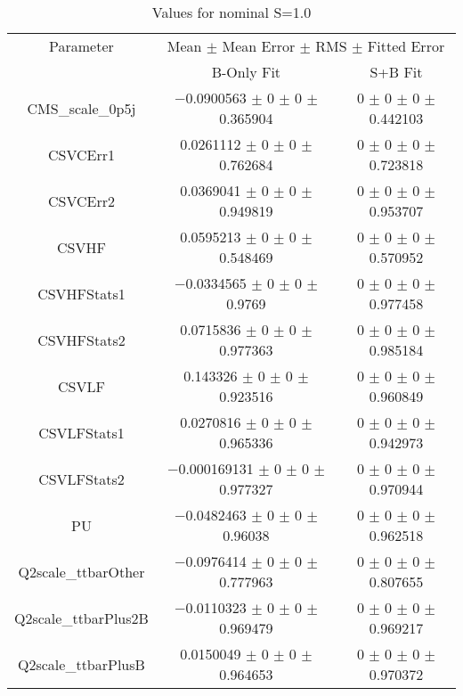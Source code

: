 \begin{table}
\centering
\caption{Values for nominal S=1.0}
\begin{tabular}{ccc}
\toprule
Parameter & \multicolumn{2}{c}{Mean $\pm$ Mean Error $\pm$ RMS $\pm$ Fitted Error}\\
 & B-Only Fit & S+B Fit\\
\midrule
CMS\_scale\_0p5j & \num{-0.0900563} $\pm$ \num{0} $\pm$ \num{0} $\pm$ \num{0.365904} & \num{0} $\pm$ \num{0} $\pm$ \num{0} $\pm$ \num{0.442103}\\
CSVCErr1 & \num{0.0261112} $\pm$ \num{0} $\pm$ \num{0} $\pm$ \num{0.762684} & \num{0} $\pm$ \num{0} $\pm$ \num{0} $\pm$ \num{0.723818}\\
CSVCErr2 & \num{0.0369041} $\pm$ \num{0} $\pm$ \num{0} $\pm$ \num{0.949819} & \num{0} $\pm$ \num{0} $\pm$ \num{0} $\pm$ \num{0.953707}\\
CSVHF & \num{0.0595213} $\pm$ \num{0} $\pm$ \num{0} $\pm$ \num{0.548469} & \num{0} $\pm$ \num{0} $\pm$ \num{0} $\pm$ \num{0.570952}\\
CSVHFStats1 & \num{-0.0334565} $\pm$ \num{0} $\pm$ \num{0} $\pm$ \num{0.9769} & \num{0} $\pm$ \num{0} $\pm$ \num{0} $\pm$ \num{0.977458}\\
CSVHFStats2 & \num{0.0715836} $\pm$ \num{0} $\pm$ \num{0} $\pm$ \num{0.977363} & \num{0} $\pm$ \num{0} $\pm$ \num{0} $\pm$ \num{0.985184}\\
CSVLF & \num{0.143326} $\pm$ \num{0} $\pm$ \num{0} $\pm$ \num{0.923516} & \num{0} $\pm$ \num{0} $\pm$ \num{0} $\pm$ \num{0.960849}\\
CSVLFStats1 & \num{0.0270816} $\pm$ \num{0} $\pm$ \num{0} $\pm$ \num{0.965336} & \num{0} $\pm$ \num{0} $\pm$ \num{0} $\pm$ \num{0.942973}\\
CSVLFStats2 & \num{-0.000169131} $\pm$ \num{0} $\pm$ \num{0} $\pm$ \num{0.977327} & \num{0} $\pm$ \num{0} $\pm$ \num{0} $\pm$ \num{0.970944}\\
PU & \num{-0.0482463} $\pm$ \num{0} $\pm$ \num{0} $\pm$ \num{0.96038} & \num{0} $\pm$ \num{0} $\pm$ \num{0} $\pm$ \num{0.962518}\\
Q2scale\_ttbarOther & \num{-0.0976414} $\pm$ \num{0} $\pm$ \num{0} $\pm$ \num{0.777963} & \num{0} $\pm$ \num{0} $\pm$ \num{0} $\pm$ \num{0.807655}\\
Q2scale\_ttbarPlus2B & \num{-0.0110323} $\pm$ \num{0} $\pm$ \num{0} $\pm$ \num{0.969479} & \num{0} $\pm$ \num{0} $\pm$ \num{0} $\pm$ \num{0.969217}\\
Q2scale\_ttbarPlusB & \num{0.0150049} $\pm$ \num{0} $\pm$ \num{0} $\pm$ \num{0.964653} & \num{0} $\pm$ \num{0} $\pm$ \num{0} $\pm$ \num{0.970372}\\

\end{tabular}
\end{table}
